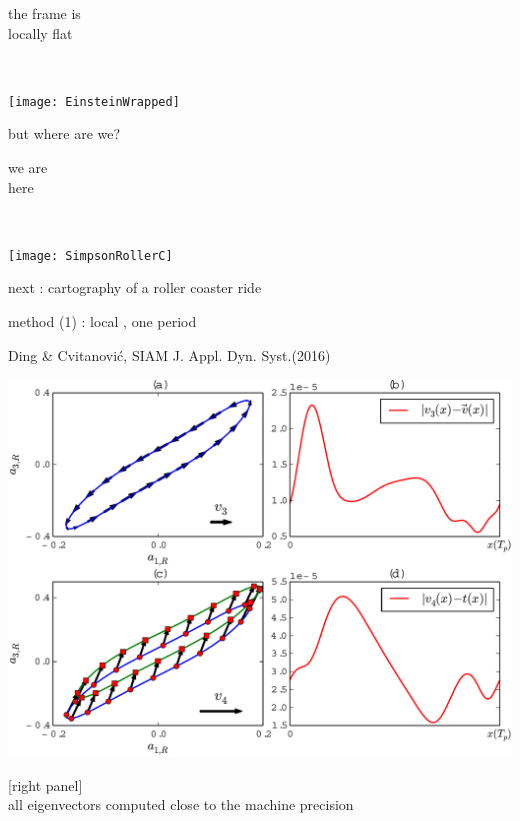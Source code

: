 \begin{frame}{}
    \begin{minipage}[b]{0.30\textwidth}
\begin{block}{
the frame is
\\
locally flat
}
\end{block}
    \end{minipage}
~~~~~~
    \begin{minipage}[b]{0.60\textwidth}
\begin{center}
\texttt{[image: EinsteinWrapped]}
\end{center}
    \end{minipage}

\medskip
but where are we?
\end{frame}

\begin{frame}{}
    \begin{minipage}[b]{0.30\textwidth}
\begin{block}{
we are \\
here
}
\end{block}
    \end{minipage}
~~~~~~
    \begin{minipage}[b]{0.50\textwidth}
\begin{center}
\texttt{[image: SimpsonRollerC]}
\end{center}
    \end{minipage}

\medskip
next : cartography of a roller coaster ride
\end{frame}


\begin{frame}{method (1) : local \rpo, one period}
\begin{block}{Ding \& Cvitanovi{\'c}, SIAM J. Appl. Dyn. Syst.(2016)}
\begin{center}
\includegraphics[width=1.0\textwidth]{../../xiong/figures/ppo1vectfield}
\end{center}
\end{block}
[right panel] \\
all eigenvectors computed close to the machine precision
\end{frame}

